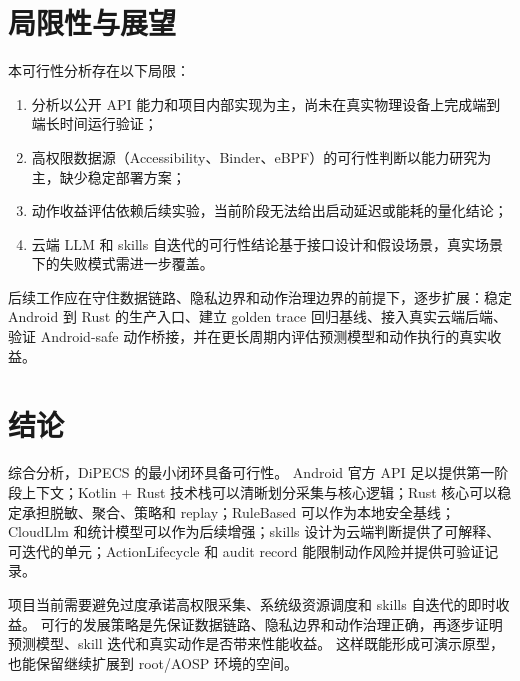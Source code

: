 \documentclass[12pt,a4paper]{article}
\begin{document}
\section{局限性与展望}\label{sec:limitations}

本可行性分析存在以下局限：

\begin{enumerate}[label=(\arabic*)]
  \item 分析以公开 API 能力和项目内部实现为主，尚未在真实物理设备上完成端到端长时间运行验证；
  \item 高权限数据源（Accessibility、Binder、eBPF）的可行性判断以能力研究为主，缺少稳定部署方案；
  \item 动作收益评估依赖后续实验，当前阶段无法给出启动延迟或能耗的量化结论；
  \item 云端 LLM 和 skills 自迭代的可行性结论基于接口设计和假设场景，真实场景下的失败模式需进一步覆盖。
\end{enumerate}

后续工作应在守住数据链路、隐私边界和动作治理边界的前提下，逐步扩展：稳定 Android 到 Rust 的生产入口、建立 golden trace 回归基线、接入真实云端后端、验证 Android-safe 动作桥接，并在更长周期内评估预测模型和动作执行的真实收益。

\section{结论}\label{sec:conclusion}

综合分析，DiPECS 的最小闭环具备可行性。
Android 官方 API 足以提供第一阶段上下文；Kotlin + Rust 技术栈可以清晰划分采集与核心逻辑；Rust 核心可以稳定承担脱敏、聚合、策略和 replay；RuleBased 可以作为本地安全基线；CloudLlm 和统计模型可以作为后续增强；skills 设计为云端判断提供了可解释、可迭代的单元；ActionLifecycle 和 audit record 能限制动作风险并提供可验证记录。

项目当前需要避免过度承诺高权限采集、系统级资源调度和 skills 自迭代的即时收益。
可行的发展策略是先保证数据链路、隐私边界和动作治理正确，再逐步证明预测模型、skill 迭代和真实动作是否带来性能收益。
这样既能形成可演示原型，也能保留继续扩展到 root/AOSP 环境的空间。



\end{document}
